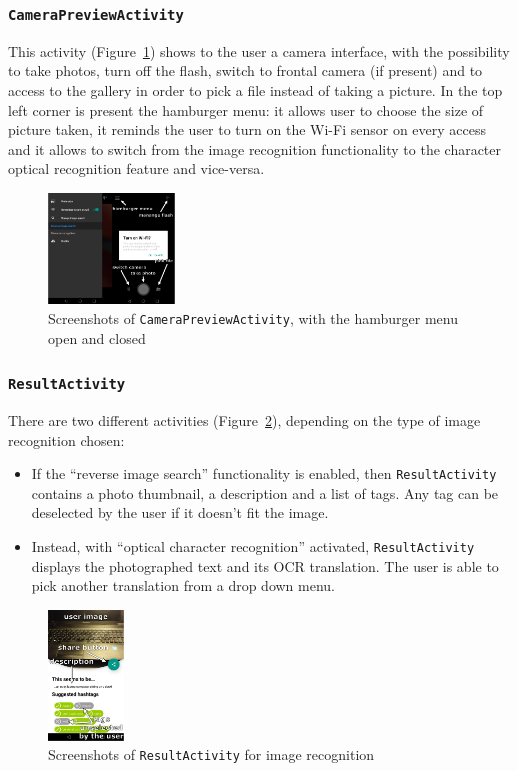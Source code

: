 \subsubsection{\texttt{CameraPreviewActivity}}
This activity (Figure~\ref{fig:mainActivity}) shows to the user a camera interface, with the possibility to take photos, turn off the flash, switch to frontal camera (if present) and to access to the gallery in order to pick a file instead of taking a picture. In the top left corner is present the hamburger menu: it allows user to choose the size of picture taken, it reminds the user to turn on the Wi-Fi sensor on every access and it allows to switch from the image recognition functionality to the character optical recognition feature and vice-versa.
\begin{figure}[h]
    \centering
    \includegraphics[width=0.30\textwidth]{../img/main_activity}
    \caption{Screenshots of \texttt{CameraPreviewActivity}, with the hamburger menu open and closed}
    \label{fig:mainActivity}
\end{figure}

\subsubsection{\texttt{ResultActivity}}
There are two different activities (Figure~\ref{fig:imageResultActivity}), depending on the type of image recognition chosen:
\begin{itemize}
	\item If the ``reverse image search'' functionality is enabled, then \texttt{ResultActivity} contains a photo thumbnail, a description and a list of tags. Any tag can be deselected by the user if it doesn't fit the image.
    \item Instead, with ``optical character recognition'' activated, \texttt{ResultActivity} displays the photographed text and its OCR translation. The user is able to pick another translation from a drop down menu.
\end{itemize}

\begin{figure}[h]
    \centering
    \includegraphics[width=0.18\textwidth]{../img/image_result_activity}
    \caption{Screenshots of \texttt{ResultActivity} for image recognition}
    \label{fig:imageResultActivity}
\end{figure}


